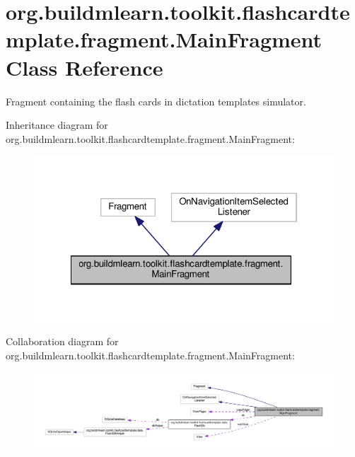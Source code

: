 \hypertarget{classorg_1_1buildmlearn_1_1toolkit_1_1flashcardtemplate_1_1fragment_1_1MainFragment}{}\section{org.\+buildmlearn.\+toolkit.\+flashcardtemplate.\+fragment.\+Main\+Fragment Class Reference}
\label{classorg_1_1buildmlearn_1_1toolkit_1_1flashcardtemplate_1_1fragment_1_1MainFragment}


Fragment containing the flash cards in dictation template\textquotesingle{}s simulator.  




Inheritance diagram for org.\+buildmlearn.\+toolkit.\+flashcardtemplate.\+fragment.\+Main\+Fragment\+:
\nopagebreak
\begin{figure}[H]
\begin{center}
\leavevmode
\includegraphics[width=322pt]{classorg_1_1buildmlearn_1_1toolkit_1_1flashcardtemplate_1_1fragment_1_1MainFragment__inherit__graph}
\end{center}
\end{figure}


Collaboration diagram for org.\+buildmlearn.\+toolkit.\+flashcardtemplate.\+fragment.\+Main\+Fragment\+:
\nopagebreak
\begin{figure}[H]
\begin{center}
\leavevmode
\includegraphics[width=350pt]{classorg_1_1buildmlearn_1_1toolkit_1_1flashcardtemplate_1_1fragment_1_1MainFragment__coll__graph}
\end{center}
\end{figure}
